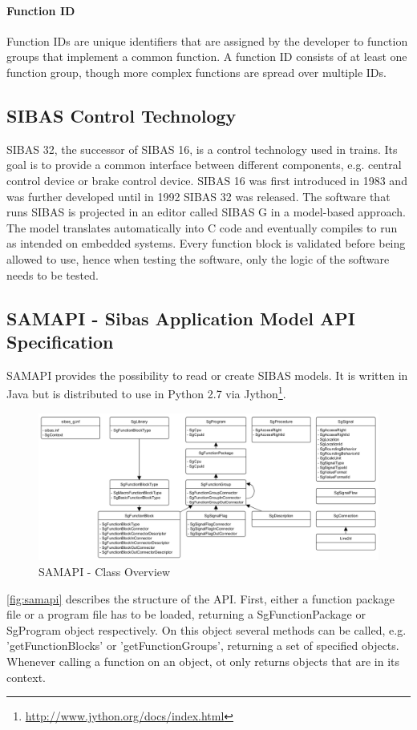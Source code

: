 \paragraph{Function ID} Function IDs are unique identifiers that are assigned by the developer to function groups that implement a common function. A function ID consists of at least one function group, though more complex functions are spread over multiple IDs.

\subsection{SIBAS Control Technology}

SIBAS 32, the successor of SIBAS 16, is a control technology used in trains. Its goal is to provide a common interface between different components, e.g. central control device or brake control device. SIBAS 16 was first introduced in 1983 and was further developed until in 1992 SIBAS 32 was released. The software that runs SIBAS is projected in an editor called SIBAS G in a model-based approach. The model translates automatically into C code and eventually compiles to run as intended on embedded systems. Every function block is validated before being allowed to use, hence when testing the software, only the logic of the software needs to be tested.


\subsection{SAMAPI - Sibas Application Model API Specification}

SAMAPI provides the possibility to read or create SIBAS models.
It is written in Java but is distributed to use in Python 2.7 via Jython\footnote{\url{http://www.jython.org/docs/index.html}}.

\begin{figure}[ht]
	\centering
	\includegraphics[width=1\textwidth]{graphic/samapi_classes.png}
	\caption{SAMAPI - Class Overview}
	\label{fig:samapi}
\end{figure}

\autoref{fig:samapi} describes the structure of the API. First, either a function package file or a program file has to be loaded, returning a SgFunctionPackage or SgProgram object respectively. On this object several methods can be called, e.g. 'getFunctionBlocks' or 'getFunctionGroups', returning a set of specified objects. Whenever calling a function on an object, ot only returns objects that are in its context.



